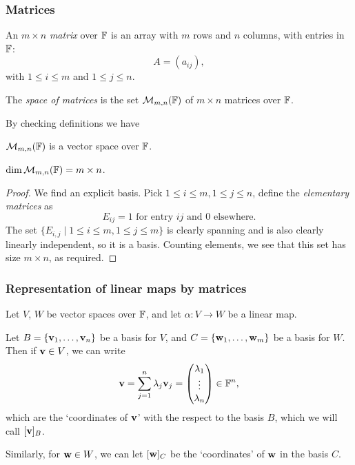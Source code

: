 \documentclass[a4paper,11pt]{article}
\begin{document}
\subsubsection*{Matrices}
\begin{definition}[Matrix]
    An $m \times n$ \emph{matrix} over ${\mathbb{F}}$ is an array with $m$ rows and $n$ columns, with entries in ${\mathbb{F}}$:
    $$
    A = (a_{ij}),
    $$
    with $1 \leq i \leq m$ and $1 \leq j \leq n$.

    The \textit{space of matrices} is the set $\mathcal{M}_{m,n}({\mathbb{F}})$ of $m \times n$ matrices over ${\mathbb{F}}$.
\end{definition}
By checking definitions we have
\begin{proposition}
    $ {\mathcal{M}}_{m,n}({\mathbb{F}}) $ is a vector space over $ {\mathbb{F}} $.
\end{proposition}
\begin{proposition}
    $ \dim {\mathcal{M}}_{m,n}({\mathbb{F}}) =m \times n$.
\end{proposition}
\begin{proof}
    We find an explicit basis. Pick $ 1\le i\le m,1\le j\le n $, define the \textit{elementary matrices} as
    \[
        E_{ij}=1 \text{ for entry } ij \text{ and } 0 \text{ elsewhere}.
    \]
    The set $\{E_{i, j} \mid 1 \leq i \leq m, 1 \leq j \leq m\}$ is clearly spanning and is also clearly linearly independent, so it is a basis. Counting elements, we see that this set has size $m \times n$, as required.
\end{proof}
\subsubsection*{Representation of linear maps by matrices}
Let $V$, $W$ be vector spaces over ${\mathbb{F}}$, and let $\alpha: V \rightarrow W$ be a linear map. 

Let $B = \{{\bf v}_1, \dots, {\bf v}_n\}$ be a basis for $V$, and $C = \{{\bf w}_1, \dots, {\bf w}_m\}$ be a basis for $W$. Then if ${\bf v} \in V$, we can write
$$
{\bf v} = \sum_{j = 1}^n \lambda_j {\bf v}_j = \begin{pmatrix}
    \lambda_1 \\ \vdots \\ \lambda_n
\end{pmatrix} \in {\mathbb{F}}^n,
$$
which are the `coordinates of ${\bf v}$' with the respect to the basis $B$, which we will call $[{\bf v}]_B$.

Similarly, for ${\bf w} \in W$, we can let $[{\bf w}]_C$ be the `coordinates' of ${\bf w}$ in the basis $C$.
\end{document}
